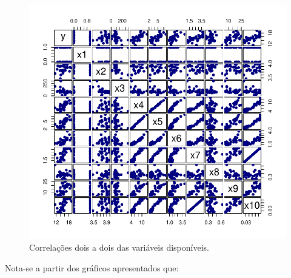 \documentclass[
  letterpaper,
  DIV=11,
  numbers=noendperiod]{scrartcl}
\begin{document}
\begin{figure}

{\centering \includegraphics{lista2_files/figure-pdf/unnamed-chunk-4-1.pdf}

}

\caption{Correlações dois a dois das variáveis disponíveis.}

\end{figure}

\newpage{}

Nota-se a partir dos gráficos apresentados que:
\end{document}
